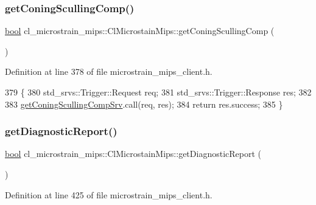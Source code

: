 \subsubsection{\texorpdfstring{get\+Coning\+Sculling\+Comp()}{getConingScullingComp()}}
{\footnotesize\ttfamily \hyperlink{classbool}{bool} cl\+\_\+microstrain\+\_\+mips\+::\+Cl\+Microstain\+Mips\+::get\+Coning\+Sculling\+Comp (\begin{DoxyParamCaption}{ }\end{DoxyParamCaption})\hspace{0.3cm}{\ttfamily [inline]}}



Definition at line 378 of file microstrain\+\_\+mips\+\_\+client.\+h.


\begin{DoxyCode}
379     \{
380         std\_srvs::Trigger::Request req;
381         std\_srvs::Trigger::Response res;
382 
383         \hyperlink{classcl__microstrain__mips_1_1ClMicrostainMips_a877393b5cf4c313e0e433e9c92163265}{getConingScullingCompSrv}.call(req, res);
384         \textcolor{keywordflow}{return} res.success;
385     \}
\end{DoxyCode}
\mbox{\label{classcl__microstrain__mips_1_1ClMicrostainMips_adbe8f64e2f6e4d48cd0efc84924b4d08}} 
\subsubsection{\texorpdfstring{get\+Diagnostic\+Report()}{getDiagnosticReport()}}
{\footnotesize\ttfamily \hyperlink{classbool}{bool} cl\+\_\+microstrain\+\_\+mips\+::\+Cl\+Microstain\+Mips\+::get\+Diagnostic\+Report (\begin{DoxyParamCaption}{ }\end{DoxyParamCaption})\hspace{0.3cm}{\ttfamily [inline]}}



Definition at line 425 of file microstrain\+\_\+mips\+\_\+client.\+h.


